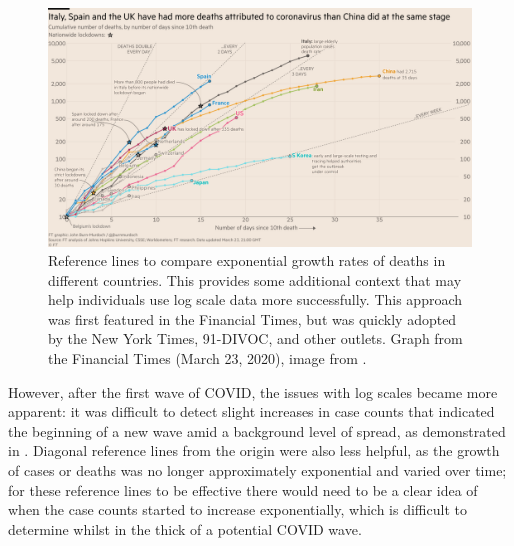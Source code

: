 \documentclass[article]{jdssv}\usepackage[]{graphicx}\usepackage[]{color}
\begin{document}
\begin{figure}
\centering
\includegraphics[width=.8\linewidth]{ft-covid-19-deaths}
\caption{Reference lines to compare exponential growth rates of deaths in different countries. This provides some additional context that may help individuals use log scale data more successfully. This approach was first featured in the Financial Times, but was quickly adopted by the New York Times, 91-DIVOC, and other outlets. Graph from the Financial Times (March 23, 2020), image from \citet{kosaraPraiseDiagonalReference2020}.}
\label{fig:diag-ref-lines}
\end{figure}



However, after the first wave of COVID, the issues with log scales became more apparent: it was difficult to detect slight increases in case counts that indicated the beginning of a new wave amid a background level of spread, as demonstrated in  . Diagonal reference lines from the origin were also less helpful, as the growth of cases or deaths was no longer approximately exponential and varied over time; for these reference lines to be effective there would need to be a clear idea of when the case counts started to increase exponentially, which is difficult to determine whilst in the thick of a potential COVID wave. 
\end{document}
